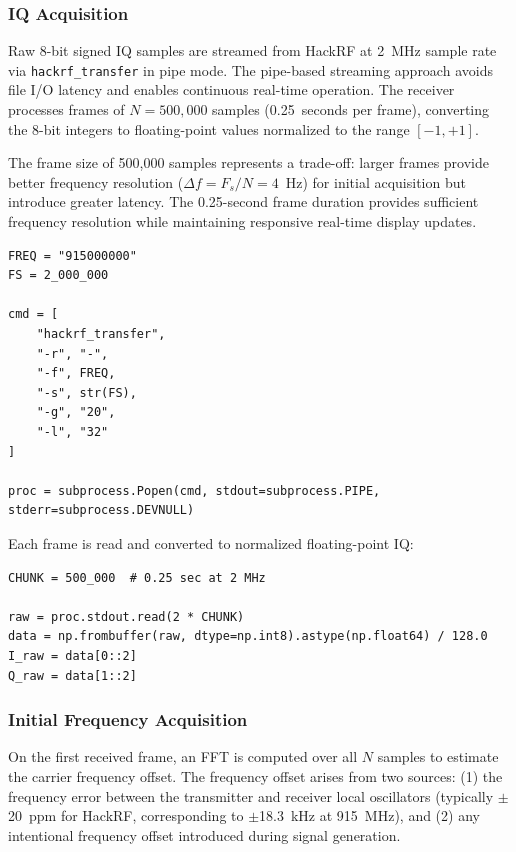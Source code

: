 \documentclass{article}
\begin{document}
\subsubsection{IQ Acquisition}

Raw 8-bit signed IQ samples are streamed from HackRF at 2~MHz sample rate via \texttt{hackrf\_transfer} in pipe mode. The pipe-based streaming approach avoids file I/O latency and enables continuous real-time operation. The receiver processes frames of $N = 500{,}000$ samples (0.25~seconds per frame), converting the 8-bit integers to floating-point values normalized to the range $[-1, +1]$.

The frame size of 500,000 samples represents a trade-off: larger frames provide better frequency resolution ($\Delta f = F_s/N = 4$~Hz) for initial acquisition but introduce greater latency. The 0.25-second frame duration provides sufficient frequency resolution while maintaining responsive real-time display updates.

\begin{verbatim}
FREQ = "915000000"
FS = 2_000_000

cmd = [
    "hackrf_transfer",
    "-r", "-",
    "-f", FREQ,
    "-s", str(FS),
    "-g", "20",
    "-l", "32"
]

proc = subprocess.Popen(cmd, stdout=subprocess.PIPE, stderr=subprocess.DEVNULL)
\end{verbatim}

Each frame is read and converted to normalized floating-point IQ:

\begin{verbatim}
CHUNK = 500_000  # 0.25 sec at 2 MHz

raw = proc.stdout.read(2 * CHUNK)
data = np.frombuffer(raw, dtype=np.int8).astype(np.float64) / 128.0
I_raw = data[0::2]
Q_raw = data[1::2]
\end{verbatim}

\subsubsection{Initial Frequency Acquisition}

On the first received frame, an FFT is computed over all $N$ samples to estimate the carrier frequency offset. The frequency offset arises from two sources: (1) the frequency error between the transmitter and receiver local oscillators (typically $\pm$20~ppm for HackRF, corresponding to $\pm$18.3~kHz at 915~MHz), and (2) any intentional frequency offset introduced during signal generation.
\end{document}
